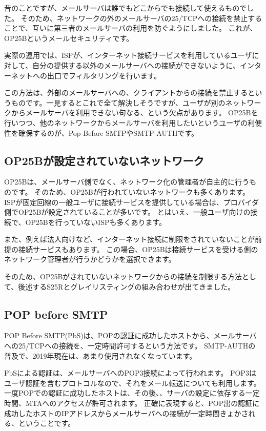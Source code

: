 昔のことですが、メールサーバは誰でもどこからでも接続して使えるものでした。
そのため、ネットワークの外のメールサーバの25/TCPへの接続を禁止することで、互いに第三者のメールサーバの利用を防ぐようにしました。
これが、OP25Bというメールセキュリティです。

実際の運用では、ISPが、インターネット接続サービスを利用しているユーザに対して、自分の提供する以外のメールサーバへの接続ができないように、インターネットへの出口でフィルタリングを行います。

この方法は、外部のメールサーバへの、クライアントからの接続を禁止するというものです。一見するとこれで全て解決しそうですが、ユーザが別のネットワークからメールサーバを利用できない句なる、という欠点があります。
OP25Bを行いつつ、他のネットワークからメールサーバを利用したいというユーザの利便性を確保するのが、Pop Before SMTPやSMTP-AUTHです。

\subsection{OP25Bが設定されていないネットワーク}

OP25Bは、メールサーバ側でなく、ネットワーク化の管理者が自主的に行うものです。
そのため、OP25Bが行われていないネットワークも多くあります。
ISPが固定回線の一般ユーザに接続サービスを提供している場合は、プロバイダ側でOP25Bが設定されていることが多いです。
とはいえ、一般ユーザ向けの接続で、OP25Bを行っていないISPも多くあります。

また、例えば法人向けなど、インターネット接続に制限をされていないことが前提の接続サービスもあります。
この場合、OP25Bは接続サービスを受ける側のネットワーク管理者が行うかどうかを選択できます。

そのため、OP25Bがされていないネットワークからの接続を制限する方法として、後述するS25Rとグレイリスティングの組み合わせが出てきました。

\subsection{POP before SMTP}

POP Before SMTP(PbS)は、POPの認証に成功したホストから、メールサーバへの25/TCPへの接続を、一定時間許可するという方法です。
SMTP-AUTHの普及で、2019年現在は、あまり使用されなくなっています。

PbSによる認証は、メールサーバへのPOP3接続によって行われます。
POP3はユーザ認証を含むプロトコルなので、それをメール転送についても利用します。
一度POPでの認証に成功したホストは、その後、、サーバの設定に依存する一定時間、MTAへのアクセスが許可されます。
正確に表現すると、POP出の認証に成功したホストのIPアドレスからメールサーバへの接続が一定時間きょかされる、ということです。

